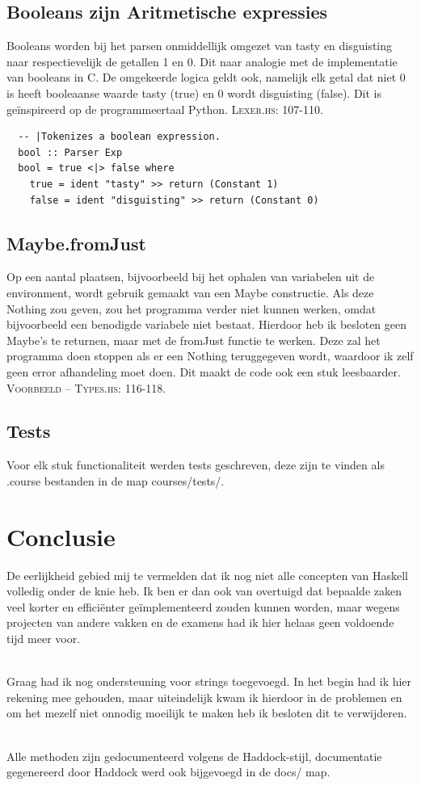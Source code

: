 \documentclass[12pt,a4paper]{report}
\begin{document}
\section{Booleans zijn Aritmetische expressies}
Booleans worden bij het parsen onmiddellijk omgezet van tasty en disguisting naar respectievelijk de getallen 1 en 0. Dit naar analogie met de implementatie van booleans in C. De omgekeerde logica geldt ook, namelijk elk getal dat niet 0 is heeft booleaanse waarde tasty (true) en 0 wordt disguisting (false). Dit is geïnspireerd op de programmeertaal Python. \textsc{Lexer.hs: 107-110.}
\begin{lstlisting}
  -- |Tokenizes a boolean expression.
  bool :: Parser Exp
  bool = true <|> false where
    true = ident "tasty" >> return (Constant 1)
    false = ident "disguisting" >> return (Constant 0)
\end{lstlisting}
\section{Maybe.fromJust}
Op een aantal plaatsen, bijvoorbeeld bij het ophalen van variabelen uit de environment, wordt gebruik gemaakt van een Maybe constructie. Als deze Nothing zou geven, zou het programma verder niet kunnen werken, omdat bijvoorbeeld een benodigde variabele niet bestaat. Hierdoor heb ik besloten geen Maybe’s te returnen, maar met de fromJust functie te werken. Deze zal het programma doen stoppen als er een Nothing teruggegeven wordt, waardoor ik zelf geen error afhandeling moet doen. Dit maakt de code ook een stuk leesbaarder. \textsc{Voorbeeld – Types.hs: 116-118.}
\section{Tests}
Voor elk stuk functionaliteit werden tests geschreven, deze zijn te vinden als .course bestanden in de map courses/tests/.
\chapter{Conclusie}
De eerlijkheid gebied mij te vermelden dat ik nog niet alle concepten van Haskell volledig onder de knie heb. Ik ben er dan ook van overtuigd dat bepaalde zaken veel korter en efficiënter geïmplementeerd zouden kunnen worden, maar wegens projecten van andere vakken en de examens had ik hier helaas geen voldoende tijd meer voor.\par\mbox{}\\
Graag had ik nog ondersteuning voor strings toegevoegd. In het begin had ik hier rekening mee gehouden, maar uiteindelijk kwam ik hierdoor in de problemen en om het mezelf niet onnodig moeilijk te maken heb ik besloten dit te verwijderen.\par\mbox{}\\
Alle methoden zijn gedocumenteerd volgens de Haddock-stijl, documentatie gegenereerd door Haddock werd ook bijgevoegd in de docs/ map.
\end{document}
